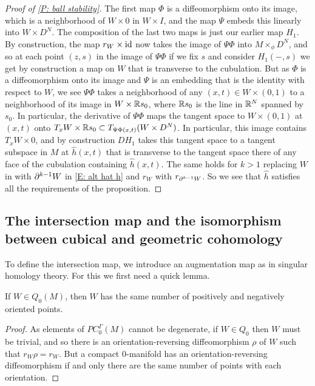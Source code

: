 \begin{proof}[Proof of \cref{P: ball stability}]
The first map $\Phi$ is a diffeomorphism onto its image, which is a neighborhood of $W \times 0$ in $W \times I$, and the map $\Psi$ embeds this linearly into $W \times D^N$. The composition of the last two maps is just our earlier map $H_1$. By construction, the map $r_W \times \mathrm{id}$ now takes the image of $\Psi\Phi$ into $M\times_\phi D^N$, and so at each point $(z,s)$ in the image of $\Psi\Phi$ if we fix $s$ and consider $H_1(-,s)$ we get by construction a map on $W$ that is transverse to the cubulation. But as $\Phi$ is a diffeomorphism onto its image and $\Psi$ is an embedding that is the identity with respect to $W$, we see $\Psi\Phi$ takes a neighborhood of any $(x,t) \in W \times (0,1)$ to a neighborhood of its image in $W \times \mathbb{R} s_0$, where $\mathbb{R} s_0$ is the line in $\mathbb{R}^N$ spanned by $s_0$. In particular, the derivative of $\Psi\Phi$ maps the tangent space to $W \times (0,1)$ at $(x,t)$ onto $ T_xW \times \mathbb{R} s_0 \subset T_{\Psi\Phi(x,t)}(W \times D^N)$. In particular, this image contains $T_xW \times 0$, and by construction $DH_1$ takes this tangent space to a tangent subspace in $M$ at $\hat h(x,t)$ that is transverse to the tangent space there of any face of the cubulation containing $\hat h(x,t)$. The same holds for $k>1$ replacing $W$ in with $\partial^{k-1}W$ in \eqref{E: alt hat h} and $r_W$ with $r_{\partial^{k-1}W}$. So we see that $\hat h$ satisfies all the requirements of the proposition.
\end{proof}






\subsection{The intersection map and the isomorphism between cubical and geometric cohomology}\label{S: intersection map}

To define the intersection map, we introduce an augmentation map as in singular homology theory. For this we first need a quick lemma.

\begin{lemma}\label{L: Q0}
If $W \in Q_0(M)$, then $W$ has the same number of positively and negatively oriented points.
\end{lemma}
\begin{proof}
 As elements of $PC_0^\Gamma(M)$ cannot be degenerate, if $W \in Q_0$ then $W$ must be trivial, and so there is an orientation-reversing diffeomorphism $\rho$ of $W$ such that $r_W\rho = r_W$. But a compact $0$-manifold has an orientation-reversing diffeomorphism if and only there are the same number of points with each orientation.
\end{proof}

